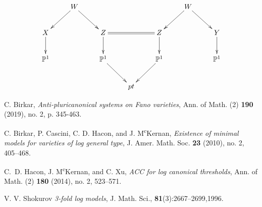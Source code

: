 \documentclass[11pt]{amsart}
\numberwithin{equation}{section}
\begin{document}
\[
  \xymatrix{
     &W\ar[ld]\ar[rd] &&&&W\ar[ld]\ar[rd] \\
    X\ar[d]& &Z\ar[d]\ar@{=}[rr]&&Z\ar[d]&&Y\ar[d]\\
    \mathbb{P}^{1}&&\mathbb{P}^{1}\ar[dr]&&\mathbb{P}^{1}\ar[dl]&&\mathbb{P}^{1}\\
                  &&&pt 
  }
\]


\begin{thebibliography}{99}

 C. Birkar,
\textit{Anti-pluricanonical systems on Fano varieties}, Ann. of Math. (2) \textbf{190} (2019), no. 2, p. 345-463.

C. Birkar, P. Cascini, C. D. Hacon, and J. M\textsuperscript{c}Kernan,  \textit{Existence of minimal models for varieties of log general type}, J. Amer. Math. Soc. {\bf 23} (2010), no. 2, 405--468.	

 C.~D. Hacon, J. M\textsuperscript{c}Kernan, and C. Xu, \textit{ACC for log canonical thresholds}, Ann. of Math. (2) \textbf{180} (2014), no. 2, 523--571.

 V. V. Shokurov \textit{3-fold log models}, J. Math. Sci., \textbf{81}(3):2667–2699,1996.

\end{thebibliography}
\end{document}
